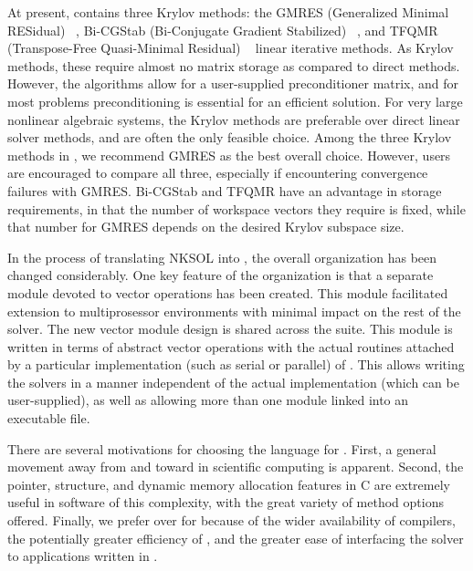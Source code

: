 At present, {\kinsol} contains three Krylov methods: the GMRES
(Generalized Minimal RESidual) ~\cite{SaSc:86}, Bi-CGStab
(Bi-Conjugate Gradient Stabilized) ~\cite{Van:92}, and TFQMR
(Transpose-Free Quasi-Minimal Residual) ~\cite{Fre:93} linear
iterative methods. As Krylov methods, these require almost no
matrix storage as compared to direct methods. However, the
algorithms allow for a user-supplied preconditioner matrix,
and for most problems preconditioning is essential for an
efficient solution. For very large nonlinear algebraic systems,
the Krylov methods are preferable over direct linear solver methods,
and are often the only feasible choice. Among the three Krylov
methods in {\kinsol}, we recommend GMRES as the best overall
choice. However, users are encouraged to compare all three,
especially if encountering convergence failures with GMRES.
Bi-CGStab and TFQMR have an advantage in storage requirements,
in that the number of workspace vectors they require is fixed,
while that number for GMRES depends on the desired Krylov
subspace size.

In the process of translating NKSOL into {\C}, the overall
{\kinsol} organization has been changed considerably. One key
feature of the {\kinsol} organization is that a separate module
devoted to vector operations has been created.  This module
facilitated extension to multiprosessor environments with minimal
impact on the rest of the solver. The new vector module design is
shared across the {\sundials} suite. This {\nvector} module is
written in terms of abstract vector operations with the actual
routines attached by a particular implementation (such as serial
or parallel) of {\nvector}. This allows writing the {\sundials}
solvers in a manner independent of the actual {\nvector}
implementation (which can be user-supplied), as well as allowing
more than one {\nvector} module linked into an executable file.

 There are
several motivations for choosing the {\C} language for {\kinsol}.
First, a general movement away from {\F} and toward {\C} in
scientific computing is apparent. Second, the pointer, structure,
and dynamic memory allocation features in C are extremely useful
in software of this complexity, with the great variety of method
options offered. Finally, we prefer {\C} over {\CPP} for {\kinsol}
because of the wider availability of {\C} compilers, the
potentially greater efficiency of {\C}, and the greater ease of
interfacing the solver to applications written in {\F}.

